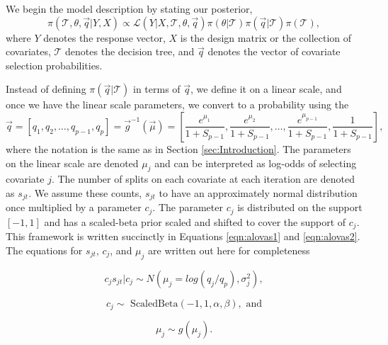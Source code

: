 We begin the model description by stating our posterior, 
\begin{equation}\label{eqn:post}
\pi(\mathcal{T}, \theta, \vec{q} \vert Y,X) \propto \mathcal{L}(Y \vert X, \mathcal{T}, \theta, \vec{q})\pi(\theta \vert \mathcal{T})\pi(\vec{q}\vert \mathcal{T})\pi(\mathcal{T}), 
\end{equation}
where $Y$ denotes the response vector, $X$ is the design matrix or the collection of covariates, $\mathcal{T}$ denotes the decision tree, and $\vec{q}$ denotes the vector of covariate selection probabilities. 

Instead of defining $\pi(\vec{q} \vert \mathcal{T})$ in terms of $\vec{q}$, we define it on a linear scale, and once we have the linear scale parameters, we convert to a probability using the \ALT
\begin{equation}\label{eqn:alt}
\vec{q} = \left[ q_1, q_2,\dots, q_{p-1}, q_p \right] =\vec{g}^{-1}(\vec{\mu})= \left[ \frac{e^{\mu_1}}{1+S_{p-1}},\frac{e^{\mu_2}}{1+S_{p-1}}, \dots,\frac{e^{\mu_{p-1}}}{1+S_{p-1}},\frac{1}{1+S_{p-1}} \right],
\end{equation} 
where the notation is the same as in Section \ref{sec:Introduction}. The parameters on the linear scale are denoted $\mu_j$ and can be interpreted as log-odds of selecting covariate $j$. The number of splits on each covariate at each iteration are denoted as $s_{jt}$. We assume these counts, $s_{jt}$ to have an approximately normal distribution once multiplied by a parameter $c_j$. The parameter $c_j$ is distributed on the support $[-1,1]$ and has a scaled-beta prior scaled and shifted to cover the support of $c_j$. This framework is written succinctly in Equations \ref{eqn:alovas1} and \ref{eqn:alovas2}. The equations for $s_{jt}$, $c_j$, and $\mu_j$ are written out here for completeness

\begin{equation}\label{eqn:alovas1}
c_js_{jt} \vert c_j \sim N\left(\mu_j=log(q_j/q_p),\sigma_j^2\right),
\end{equation}

\begin{equation}\label{eqn:alovas2}
c_j \sim \text{ ScaledBeta}(-1,1,\alpha, \beta), \text{   and}	
\end{equation}

\begin{equation}\label{eqn:flavor_prior}
\mu_j \sim g(\mu_j). 
\end{equation}

